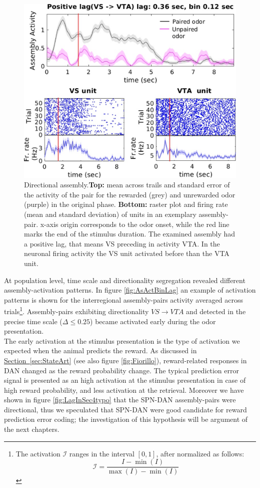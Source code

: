 \begin{figure}
    \centering
    \includegraphics[scale=0.6]{figures/DirectionalAsEx1.pdf}
    \caption{Directional assembly.\textbf{Top:} mean across trails and standard error of the activity of the pair for the rewarded (grey) and unrewarded odor (purple) in the original phase. \textbf{Bottom:} raster plot and firing rate (mean and standard deviation) of units in an exemplary assembly-pair. x-axis origin corresponds to the odor onset, while the red line marks the end of the stimulus duration. The examined assembly had a positive lag, that means VS preceding in activity VTA. In the neuronal firing activity the VS unit activated before than the VTA unit.}
    \label{fig:directional_assembly}
\end{figure}
At population level, time scale and directionality segregation revealed different assembly-activation patterns. In figure \ref{fig:AsActBinLag} an example of activation patterns is shown for the interregional assembly-pairs activity averaged across trials\footnote{The activation $\mathcal{I}$ ranges in the interval $[0,1]$, after normalized as follows:
\begin{equation}
    \mathcal{I} = \frac{I-\min(I)}{\max(I)-\min(I)}
    \label{eq:norm}
\end{equation}}. 
Assembly-pairs exhibiting directionality $VS \rightarrow VTA$ and detected in the precise time scale ($\Delta \le 0.25$) became activated early during the odor presentation.\\The early activation at the stimulus presentation is the type of activation we expected when the animal predicts the reward. As discussed in \hyperref[sec:StateArt]{Section~\ref*{sec:StateArt}} (see also figure \ref{fig:Fiorillo}), reward-related responses in DAN changed as the reward probability change. The typical prediction error signal is presented as an high activation at the stimulus presentation in case of high reward probability, and less activation at the retrieval. Moreover we have shown in figure \ref{fig:LagInSec4typo} that the SPN-DAN assembly-pairs were directional, thus we speculated that SPN-DAN were good candidate for reward prediction error coding; the investigation of this hypothesis will be argument of the next chapters.\\

